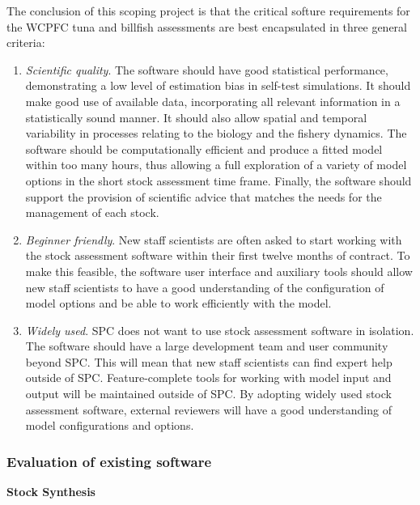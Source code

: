 \documentclass{SCreport}
\begin{document}
The conclusion of this scoping project is that the critical softure requirements
for the WCPFC tuna and billfish assessments are best encapsulated in three
general criteria:

\begin{enumerate}
  \item \textit{Scientific quality}. The software should have good statistical
  performance, demonstrating a low level of estimation bias in self-test
  simulations. It should make good use of available data, incorporating all
  relevant information in a statistically sound manner. It should also allow
  spatial and temporal variability in processes relating to the biology and the
  fishery dynamics. The software should be computationally efficient and produce
  a fitted model within too many hours, thus allowing a full exploration of a
  variety of model options in the short stock assessment time frame. Finally,
  the software should support the provision of scientific advice that matches
  the needs for the management of each stock.
  \item \textit{Beginner friendly}. New staff scientists are often asked to
  start working with the stock assessment software within their first twelve
  months of contract. To make this feasible, the software user interface and
  auxiliary tools should allow new staff scientists to have a good understanding
  of the configuration of model options and be able to work efficiently with the
  model.
  \item \textit{Widely used}. SPC does not want to use stock assessment software
  in isolation. The software should have a large development team and user
  community beyond SPC. This will mean that new staff scientists can find expert
  help outside of SPC. Feature-complete tools for working with model input and
  output will be maintained outside of SPC. By adopting widely used stock
  assessment software, external reviewers will have a good understanding of
  model configurations and options.
\end{enumerate}

\vspace{1ex}

\subsubsection{Evaluation of existing software}

\textbf{Stock Synthesis}
\label{sec:ss-software-evaluation}

\vspace{-1ex}
\end{document}
